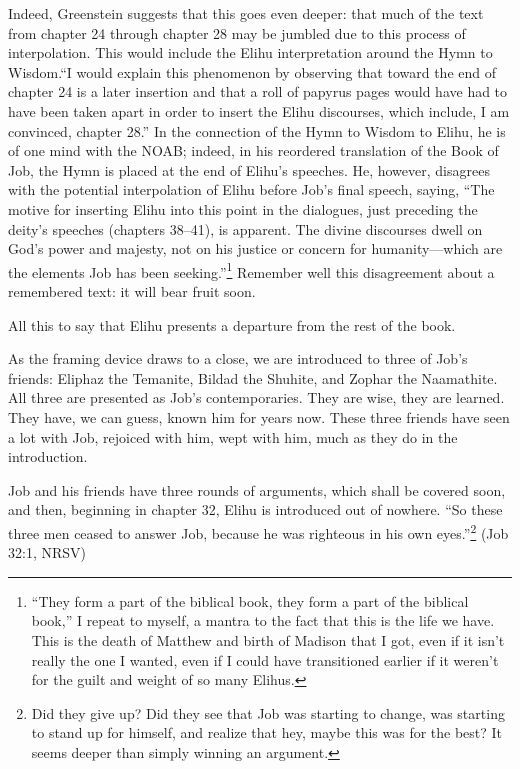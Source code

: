 Indeed, Greenstein suggests that this goes even deeper: that much of the text from chapter 24 through chapter 28 may be jumbled due to this process of interpolation. This would include the Elihu interpretation around the Hymn to Wisdom.``I would explain this phenomenon by observing that toward the end of chapter 24 is a later insertion and that a roll of papyrus pages would have had to have been taken apart in order to insert the Elihu discourses, which include, I am convinced, chapter 28.'' \parencite[28]{greenstein} In the connection of the Hymn to Wisdom to Elihu, he is of one mind with the NOAB; indeed, in his reordered translation of the Book of Job, the Hymn is placed at the end of Elihu's speeches. He, however, disagrees with the potential interpolation of Elihu before Job's final speech, saying, ``The motive for inserting Elihu into this point in the dialogues, just preceding the deity's speeches (chapters 38--41), is apparent. The divine discourses dwell on God's power and majesty, not on his justice or concern for humanity---which are the elements Job has been seeking.''\footnote{``They form a part of the biblical book, they form a part of the biblical book,'' I repeat to myself, a mantra to the fact that this is the life we have. This is the death of Matthew and birth of Madison that I got, even if it isn't really the one I wanted, even if I could have transitioned earlier if it weren't for the guilt and weight of so many Elihus.} \parencite[183]{greenstein} Remember well this disagreement about a remembered text: it will bear fruit soon.

All this to say that Elihu presents a departure from the rest of the book.

As the framing device draws to a close, we are introduced to three of Job's friends: Eliphaz the Temanite, Bildad the Shuhite, and Zophar the Naamathite. All three are presented as Job's contemporaries. They are wise, they are learned. They have, we can guess, known him for years now. These three friends have seen a lot with Job, rejoiced with him, wept with him, much as they do in the introduction.

Job and his friends have three rounds of arguments, which shall be covered soon, and then, beginning in chapter 32, Elihu is introduced out of nowhere. ``So these three men ceased to answer Job, because he was righteous in his own eyes.''\footnote{Did they give up? Did they see that Job was starting to change, was starting to stand up for himself, and realize that hey, maybe this was for the best? It seems deeper than simply winning an argument.} (Job 32:1, NRSV)

